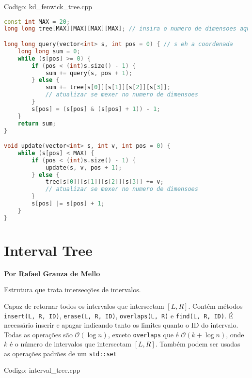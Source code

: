 \documentclass[10pt, a4paper, oneside]{book}
\begin{document}
\hfill

Codigo: kd\_fenwick\_tree.cpp

\begin{lstlisting}[language=C++]
const int MAX = 20;
long long tree[MAX][MAX][MAX][MAX]; // insira o numero de dimensoes aqui

long long query(vector<int> s, int pos = 0) { // s eh a coordenada
    long long sum = 0;
    while (s[pos] >= 0) {
        if (pos < (int)s.size() - 1) {
            sum += query(s, pos + 1);
        } else {
            sum += tree[s[0]][s[1]][s[2]][s[3]];
            // atualizar se mexer no numero de dimensoes
        }
        s[pos] = (s[pos] & (s[pos] + 1)) - 1;
    }
    return sum;
}

void update(vector<int> s, int v, int pos = 0) {
    while (s[pos] < MAX) {
        if (pos < (int)s.size() - 1) {
            update(s, v, pos + 1);
        } else {
            tree[s[0]][s[1]][s[2]][s[3]] += v;
            // atualizar se mexer no numero de dimensoes
        }
        s[pos] |= s[pos] + 1;
    }
}\end{lstlisting}
\hfill

\section{Interval Tree}


\textbf{Por Rafael Granza de Mello}



Estrutura que trata intersecções de intervalos.



Capaz de retornar todos os intervalos que intersectam $[L, R]$. Contém métodos \texttt{insert({L, R, ID})}, \texttt{erase({L, R, ID})}, \texttt{overlaps(L, R)} e \texttt{find({L, R, ID})}. É necessário inserir e apagar indicando tanto os limites quanto o ID do intervalo. Todas as operações são $\mathcal{O}(\log n)$, exceto \texttt{overlaps} que é $\mathcal{O}(k + \log n)$, onde $k$ é o número de intervalos que intersectam $[L, R]$. Também podem ser usadas as operações padrões de um \texttt{std::set}

\hfill

Codigo: interval\_tree.cpp
\end{document}
